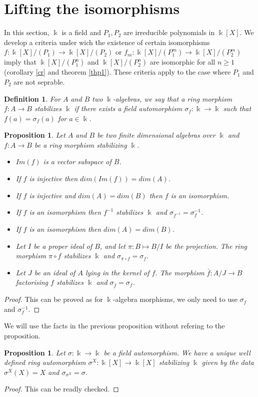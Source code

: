 \documentclass[12pt, reqno]{amsart}
\newtheorem{proposition}[theorem]{Proposition}
\newtheorem{definition}[theorem]{Definition}
\newcommand{\K}{ {\Bbbk} }
\newcommand{\KP}{{\Bbbk[X]/(P_1)}}
\newcommand{\KPP}{{\Bbbk[X]/(P_2)}}
\newcommand{\KPn}{{\Bbbk[X]/(P_1^n)}}
\newcommand{\KPPn}{{\Bbbk[X]/(P_2^n)}}
\begin{document}
 


\section{Lifting the isomorphisms}\label{S2}
In this section, $\K$ is a field and $P_1,P_2$ are irreducible polynomials in $\K[X]$. We develop a criteria under wich the existence of certain isomorphisms $f: \KP \to \KPP$ or $f_m: \K[X]/ (P_1^m)\to \K[X]/ (P_2^m)$ imply that $\KPn$ and $\KPPn$ are isomorphic for all $n\geq 1$ (corollary \ref{cr} and theorem \ref{thp1}). These criteria apply to the case where $P_1$ and $P_2$ are not seprable.

\begin{definition}
For $A$ and $B$ two $\K$-algebras, we say that a ring morphism $f:A\to B$ stabilizes $\K$ if there exists a field automorphism $\sigma_f:\K\to \K$ such that $f(a)=\sigma_f(a)$ for $a\in \K$. 
\end{definition}

\begin{proposition}
Let $A$ and $B$ be two finite dimensional algebras over $\K$ and $f:A\to B$ be a ring morphism stabilizing $\K$.
\begin{itemize}
\item[1)] $Im(f)$ is a vector subspace of $B$.
\item[2)] If $f$ is injective then $dim(Im(f))=dim(A)$.
\item[3)] If $f$ is injective and $dim(A)=dim(B)$ then $f$ is an isomorphism.
\item[4)] If $f$ is an isomorphism then $f^{-1}$ stabilizes $\K$ and $\sigma_{f^{-1}}=\sigma_f^{-1}$.
\item[5)] If $f$ is an isomorphism then $dim(A)=dim(B)$.
\item[6)] Let $I$ be a proper ideal of $B$, and let $\pi : B\mapsto B/I$ be the projection. The ring morphism $\pi \circ f$ stabilizes $\K$ and $\sigma_{\pi\circ f}=\sigma_f$.
\item[7)] Let $J$ be an ideal of $A$ lying in the kernel of $f$. The morphism $\bar{f}: A/J \to B$ factorising $f$ stabilizes $\K$ and $\sigma_{\bar{f}}=\sigma_f$. 
\end{itemize}
\end{proposition}
\begin{proof}
This can be proved as for $\K$-algebra morphisms, we only need to use $\sigma_f$ and $\sigma_f^{-1}$.
\end{proof}

We will use the facts in the previous proposition without refering to the proposition.
\begin{proposition}
Let $\sigma : \K \to \K$ be a field automorphism. We have a unique well defined ring automorphism $\sigma^X : \K[X] \to \K[X]$ stabilizing $\K$ given by the data $\sigma^X(X)=X$ and $\sigma_{\sigma^X}=\sigma$.
\end{proposition}
\begin{proof}
This can be readly checked.
\end{proof}
\end{document}
